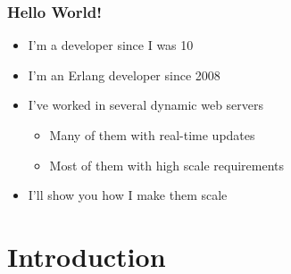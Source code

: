 \documentclass[utf8]{beamer}
\begin{document}
\begin{frame}
	\frametitle{Hello World!}
	\begin{itemize}
		\item<+-> I'm a developer since I was 10
		\item<+-> I'm an Erlang developer since 2008
		\item<+-> I've worked in several dynamic web servers
			\begin{itemize}
				\item<+-> Many of them with real-time updates
				\item<+-> Most of them with high scale requirements
			\end{itemize}
		\item<+-> I'll show you how I make them scale
	\end{itemize}
\end{frame}

\section{Introduction}
\end{document}
